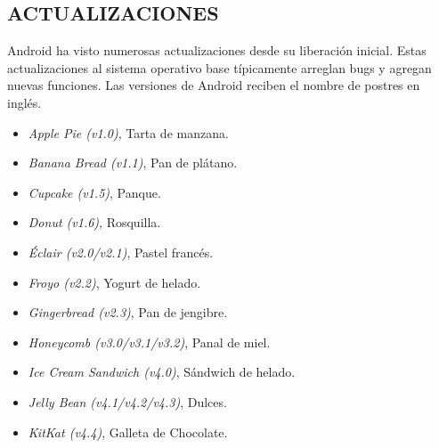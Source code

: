 \subsection*{ACTUALIZACIONES}
Android ha visto numerosas actualizaciones desde su liberación inicial. Estas actualizaciones al sistema operativo base típicamente arreglan bugs y agregan nuevas funciones.
Las versiones de Android reciben el nombre de postres en inglés.
\begin{itemize}
	\item \textit{Apple Pie (v1.0)}, Tarta de manzana.
	\item \textit{Banana Bread (v1.1)}, Pan de plátano.
	\item \textit{Cupcake (v1.5)}, Panque.
	\item \textit{Donut (v1.6)}, Rosquilla.
	\item \textit{Éclair (v2.0/v2.1)}, Pastel francés.
	\item \textit{Froyo (v2.2)}, Yogurt de helado.
	\item \textit{Gingerbread (v2.3)}, Pan de jengibre. 
	\item \textit{Honeycomb (v3.0/v3.1/v3.2)}, Panal de miel.
	\item \textit{Ice Cream Sandwich (v4.0)}, Sándwich de helado.
	\item \textit{Jelly Bean (v4.1/v4.2/v4.3)}, Dulces.
	\item \textit{KitKat (v4.4)}, Galleta de Chocolate.
\end{itemize}

